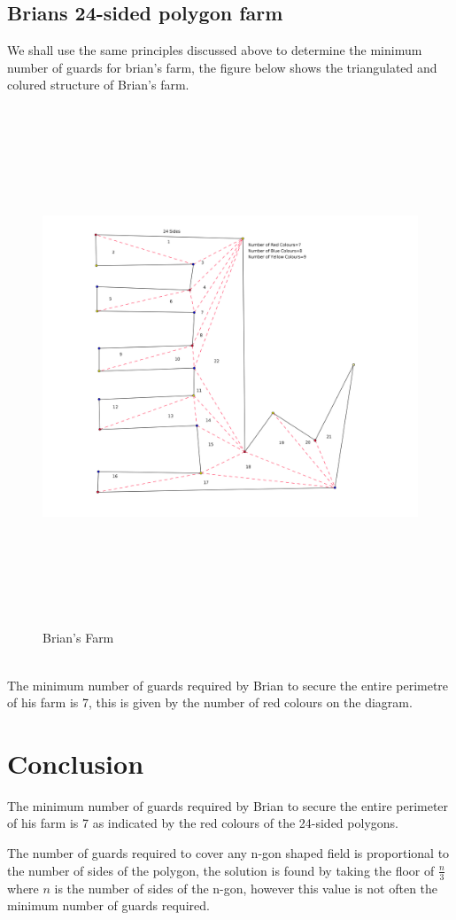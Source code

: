 \documentclass[10pt,a4paper]{article}
\begin{document}
\subsection{Brians 24-sided polygon farm}
We shall use the same principles discussed above to determine the minimum number of guards for brian's farm, the figure below shows the triangulated and colured structure of Brian's farm.
\begin{figure}[h!]\label{colouration}
\centering
\includegraphics[width=12.0cm,height= 15.5cm]{image3.png}
\caption{Brian's Farm}
\end{figure}
\\
The minimum number of guards required by Brian to secure the entire perimetre of his farm is 7, this is given by the number of red colours on the diagram. 
\newpage
\section{Conclusion}
The minimum number of guards required by Brian to secure the entire perimeter of his farm is 7 as indicated by the red colours of the 24-sided polygons. 

The number of guards required to cover any n-gon shaped field is proportional to the number of sides of the polygon, the solution is found by taking the floor of $\frac{n}{3}$ where $n$ is the number of sides of the n-gon, however this value is not often the minimum number of guards required.



\end{document}
